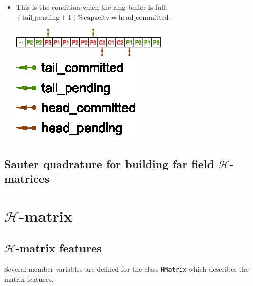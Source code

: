 \documentclass[11pt, a4paper]{article}
\begin{document}
\begin{itemize}
\begin{center}
  \end{center}
\item This is the condition when the ring buffer is full:
  $(\text{tail\_pending} + 1) \% \text{capacity} = \text{head\_committed}$.
  \begin{center}
    \includegraphics[width=0.6\textwidth,
    keepaspectratio]{figures/2023-05-10-ring-buffer-full}
    \includegraphics{figures/2023-05-10-ring-buffer-pointer-symbols}
  \end{center}
\end{itemize}

\subsection{Sauter quadrature for building far field $\mathcal{H}$-matrices}

\section{$\mathcal{H}$-matrix}

\subsection{$\mathcal{H}$-matrix features}

Several member variables are defined for the class \texttt{HMatrix} which describes the
matrix features.
\end{document}
